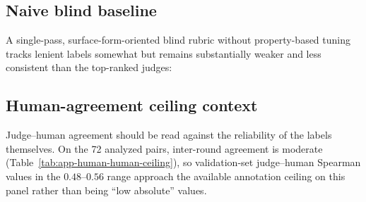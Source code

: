 \documentclass{article}
\begin{document}
\subsection{Naive blind baseline}
A single-pass, surface-form-oriented blind rubric without property-based tuning tracks lenient labels somewhat but remains substantially weaker and less consistent than the top-ranked judges:

\begin{table}[h]
  \centering
  \small
  \caption{\textbf{Naive blind baseline vs.\ validation labels (0--5 scale).} Included as a negative control; not used for ranking claims.}
  \label{tab:app-naive-blind-baseline}
\end{table}

\subsection{Human-agreement ceiling context}
Judge--human agreement should be read against the reliability of the labels themselves.
On the 72 analyzed pairs, inter-round agreement is moderate (Table~\ref{tab:app-human-human-ceiling}), so validation-set judge--human Spearman values in the $0.48$--$0.56$ range approach the available annotation ceiling on this panel rather than being ``low absolute'' values.
\end{document}
